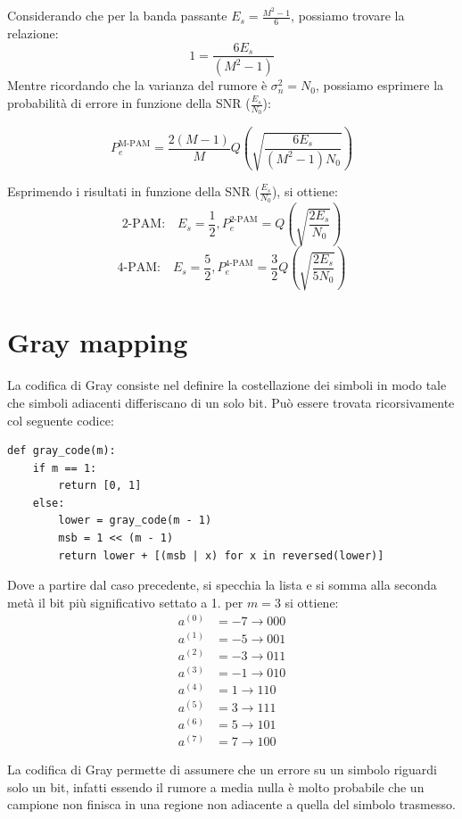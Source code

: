Considerando che per la banda passante $E_s = \frac{M^2 - 1}{6}$, possiamo trovare la relazione:
\[
    1 = \frac{6 E_s}{(M^2 - 1)}
\]
Mentre ricordando che la varianza del rumore è $\sigma_n^2 = N_0$, possiamo esprimere la probabilità di errore in funzione della SNR ($\frac{E_s}{N_0}$):

\[
    P_e^{\text{M-PAM}} = \frac{2(M - 1)}{M} Q\left(\sqrt{\frac{6 E_s}{(M^2 - 1) N_0}}\right)
\]


Esprimendo i risultati in funzione della SNR ($\frac{E_s}{N_0}$), si ottiene:
\[
    \text{2-PAM:} \quad E_s = \frac{1}{2}, P^{\text{2-PAM}}_e = Q\left( \sqrt{\frac{2 E_s}{N_0}} \right)
\]
\[
    \text{4-PAM:} \quad E_s = \frac{5}{2}, P^{\text{4-PAM}}_e = \frac{3}{2} Q\left( \sqrt{\frac{2 E_s}{5 N_0}} \right)
\]




\section*{Gray mapping}
La codifica di Gray consiste nel definire la costellazione dei simboli in modo tale che simboli adiacenti differiscano di un solo bit.
Può essere trovata ricorsivamente col seguente codice:


\begin{verbatim}
def gray_code(m):
    if m == 1:
        return [0, 1] 
    else:
        lower = gray_code(m - 1)
        msb = 1 << (m - 1)
        return lower + [(msb | x) for x in reversed(lower)]
\end{verbatim}
Dove a partire dal caso precedente, si specchia la lista e si somma alla seconda metà il bit più significativo settato a 1.
per $m=3$ si ottiene:
\begin{align*}
    a^{(0)} & = -7 \rightarrow 000 \\
    a^{(1)} & = -5 \rightarrow 001 \\
    a^{(2)} & = -3 \rightarrow 011 \\
    a^{(3)} & = -1 \rightarrow 010 \\
    a^{(4)} & = 1 \rightarrow 110  \\
    a^{(5)} & = 3 \rightarrow 111  \\
    a^{(6)} & = 5 \rightarrow 101  \\
    a^{(7)} & = 7 \rightarrow 100
\end{align*}



La codifica di Gray permette di assumere che un errore su un simbolo riguardi solo un bit, infatti essendo il rumore a media nulla è molto probabile che un campione non finisca in una regione non adiacente a quella del simbolo trasmesso.

